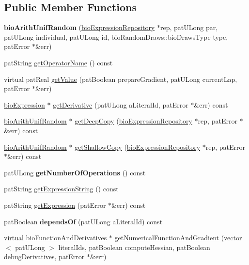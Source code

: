 \subsection*{Public Member Functions}
\begin{DoxyCompactItemize}
\item 
\mbox{\label{classbio_arith_unif_random_a0d73002a7576849dc2233b79d26248f6}} 
{\bfseries bio\+Arith\+Unif\+Random} (\hyperlink{classbio_expression_repository}{bio\+Expression\+Repository} $\ast$rep, pat\+U\+Long par, pat\+U\+Long individual, pat\+U\+Long id, bio\+Random\+Draws\+::bio\+Draws\+Type type, pat\+Error $\ast$\&err)
\item 
pat\+String \hyperlink{classbio_arith_unif_random_acd356155220e3b8cbc5d1580e1ec0f47}{get\+Operator\+Name} () const
\item 
virtual pat\+Real \hyperlink{classbio_arith_unif_random_adf48d57d0dc6d518950c58dc13b65a32}{get\+Value} (pat\+Boolean prepare\+Gradient, pat\+U\+Long current\+Lap, pat\+Error $\ast$\&err)
\item 
\hyperlink{classbio_expression}{bio\+Expression} $\ast$ \hyperlink{classbio_arith_unif_random_ab235d1b207d96e122b5b595ddeb70a68}{get\+Derivative} (pat\+U\+Long a\+Literal\+Id, pat\+Error $\ast$\&err) const
\item 
\hyperlink{classbio_arith_unif_random}{bio\+Arith\+Unif\+Random} $\ast$ \hyperlink{classbio_arith_unif_random_ad7aaa2ab5f06eb38945d39359bb55df5}{get\+Deep\+Copy} (\hyperlink{classbio_expression_repository}{bio\+Expression\+Repository} $\ast$rep, pat\+Error $\ast$\&err) const
\item 
\hyperlink{classbio_arith_unif_random}{bio\+Arith\+Unif\+Random} $\ast$ \hyperlink{classbio_arith_unif_random_a8e81dcec495449b481729aa3769696ad}{get\+Shallow\+Copy} (\hyperlink{classbio_expression_repository}{bio\+Expression\+Repository} $\ast$rep, pat\+Error $\ast$\&err) const
\item 
\mbox{\label{classbio_arith_unif_random_a2b641a7dd14bea4132412192ea8abbeb}} 
pat\+U\+Long {\bfseries get\+Number\+Of\+Operations} () const
\item 
pat\+String \hyperlink{classbio_arith_unif_random_a5d53c24c5b584c9ce817c6140b3e6001}{get\+Expression\+String} () const
\item 
pat\+String \hyperlink{classbio_arith_unif_random_a4c81af6983404929d1e06367f69a2256}{get\+Expression} (pat\+Error $\ast$\&err) const
\item 
\mbox{\label{classbio_arith_unif_random_ae0cc538b07be9f3a79c9716dd2898db8}} 
pat\+Boolean {\bfseries depends\+Of} (pat\+U\+Long a\+Literal\+Id) const
\item 
virtual \hyperlink{classbio_function_and_derivatives}{bio\+Function\+And\+Derivatives} $\ast$ \hyperlink{classbio_arith_unif_random_a0a5860c93f0efaea7f448d44f76cae60}{get\+Numerical\+Function\+And\+Gradient} (vector$<$ pat\+U\+Long $>$ literal\+Ids, pat\+Boolean compute\+Hessian, pat\+Boolean debug\+Derivatives, pat\+Error $\ast$\&err)
\end{DoxyCompactItemize}
